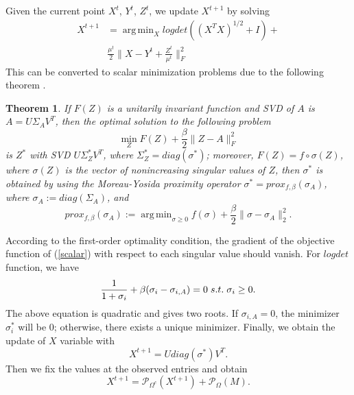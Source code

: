 \documentclass[letterpaper]{article}
\newtheorem{theorem}{Theorem}
\DeclareMathOperator*{\argmin}{arg\,min}
\begin{document}
Given the current point $X^t$, $Y^t$,  $Z^t$, we update $X^{t+1}$ by solving
\begin{equation}
\begin{split}
X^{t+1}&=\argmin_{X} logdet ((X^TX)^{1/2}+I)+\\
&\frac{\mu^t}{2}\|X-Y^t+\frac{Z^t}{\mu^t}\|_F^2
\end{split}
\label{noncvx}
\end{equation}
This can be converted to scalar minimization problems due to the following theorem \cite{kang2015logdet}.
\begin{theorem}
\label{thm}
If $F(Z)$ is a unitarily invariant function and SVD of $A$ is $A = U \Sigma_A V^T$, then the optimal solution to the following problem
\begin{equation}
\min_{Z}F(Z)+\frac{\beta}{2}\|Z-A\|_F^{2}
\label{eq:Zobj}
\end{equation}
 is $Z^*$ with SVD $U\Sigma_Z^* V^T$, where $\Sigma_Z^* = diag\left(\sigma^*\right)$; moreover, $F(Z) = f \circ \sigma(Z)$, where $\sigma(Z)$ is the vector of nonincreasing  singular values of $Z$, %
 then $\sigma^*$ is obtained by using the Moreau-Yosida proximity operator
$\sigma^* = prox_{f, \beta} (\sigma_{A})$, where $\sigma_A := diag(\Sigma_A)$, and
\begin{equation}
\label{scalar}
prox_{f, \beta} (\sigma_A) := \argmin_{\sigma\ge 0} f(\sigma) + \frac{\beta}{2}\|\sigma - \sigma_A\|_2^2.
\end{equation}
\end{theorem}
According to the first-order optimality condition, the gradient of the objective function of  (\ref{scalar}) with respect to each singular value should vanish.
For $logdet$ function, we have
\begin{equation}
\label{svdf}
\frac{1}{1+\sigma_i}+\beta (\sigma_{i}-\sigma_{i,A})=0\hspace{0.1cm} s.t. \hspace{0.1cm}\sigma_i \ge  0.%
\end{equation}
The above equation is quadratic and gives two roots. If $\sigma_{i,A}=0$, the minimizer $\sigma_i^*$ will be 0; otherwise, there exists a unique minimizer. Finally, we obtain the update of $X$ variable with
\begin{equation}
X^{t+1}=U diag(\sigma^{*}) V^T.
\end{equation}
Then we fix the values at the observed entries and obtain
\begin{equation}
\label{solveJ}
X^{t+1}=\mathcal{P}_{\Omega^c}(X^{t+1})+\mathcal{P}_\Omega(M).
\end{equation}
\end{document}
